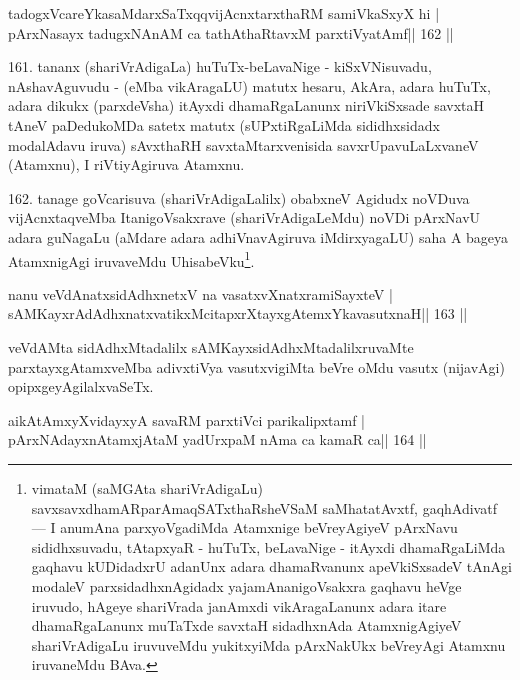 \begin{shl}
tadogxVcareYkasaMdarxSaTxqqvijAcnxtarxthaRM samiVkaSxyX hi |
pArxNasayx tadugxNAnAM ca tathAthaRtavxM parxtiVyatAmf\hfill || 162 ||
\end{shl}

\begin{artha}
161. tananx (shariVrAdigaLa) huTuTx-beLavaNige - kiSxVNisuvadu,  nAshavAguvudu - (eMba vikAragaLU) matutx hesaru, AkAra, adara huTuTx, adara dikukx (parxdeVsha) itAyxdi dhamaRgaLanunx niriVkiSxsade savxtaH tAneV paDedukoMDa satetx  matutx (sUPxtiRgaLiMda sididhxsidadx modalAdavu iruva) sAvxthaRH savxtaMtarxvenisida savxrUpavuLaLxvaneV (Atamxnu), I riVtiyAgiruva Atamxnu.
\end{artha}

\begin{artha}
162. tanage goVcarisuva (shariVrAdigaLalilx) obabxneV Agidudx noVDuva  vijAcnxtaqveMba ItanigoVsakxrave (shariVrAdigaLeMdu) noVDi pArxNavU adara guNagaLu (aMdare adara adhiVnavAgiruva iMdirxyagaLU) saha A bageya AtamxnigAgi iruvaveMdu UhisabeVku\footnote[9]{vimataM (saMGAta shariVrAdigaLu) savxsavxdhamARparAmaqSATxthaRsheVSaM saMhatatAvxtf, gaqhAdivatf  {\rm ---}  I anumAna parxyoVgadiMda Atamxnige beVreyAgiyeV pArxNavu sididhxsuvadu, tAtapxyaR - huTuTx, beLavaNige - itAyxdi dhamaRgaLiMda gaqhavu kUDidadxrU adanUnx adara dhamaRvanunx apeVkiSxsadeV tAnAgi modaleV parxsidadhxnAgidadx yajamAnanigoVsakxra gaqhavu heVge iruvudo, hAgeye shariVrada janAmxdi vikAragaLanunx adara itare dhamaRgaLanunx muTaTxde savxtaH sidadhxnAda AtamxnigAgiyeV shariVrAdigaLu iruvuveMdu yukitxyiMda pArxNakUkx beVreyAgi Atamxnu iruvaneMdu BAva.}.
\end{artha}


\begin{shl}
nanu veVdAnatxsidAdhxnetxV na vasatxvXnatxramiSayxteV |
sAMKayxrAdAdhxnatxvatikxMcitapxrXtayxgAtemxYkavasutxnaH\hfill || 163 ||
\end{shl}

\begin{artha}
veVdAMta sidAdhxMtadalilx sAMKayxsidAdhxMtadalilxruvaMte  parxtayxgAtamxveMba adivxtiVya vasutxvigiMta beVre oMdu vasutx (nijavAgi) opipxgeyAgilalxvaSeTx.
\end{artha}

\begin{shl}
aikAtAmxyXvidayxyA savaRM parxtiVci parikalipxtamf |
pArxNAdayxnAtamxjAtaM yadUrxpaM nAma ca kamaR ca\hfill || 164 ||
\end{shl}

